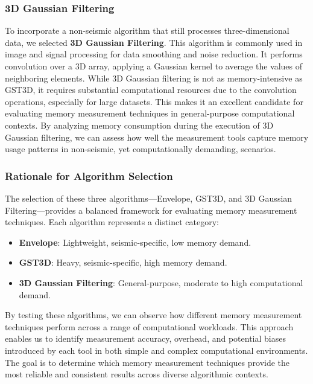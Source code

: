 
\subsubsection{3D Gaussian Filtering}

To incorporate a non-seismic algorithm that still processes three-dimensional data, we selected \textbf{3D Gaussian Filtering}.
This algorithm is commonly used in image and signal processing for data smoothing and noise reduction.
It performs convolution over a 3D array, applying a Gaussian kernel to average the values of neighboring elements.
While 3D Gaussian filtering is not as memory-intensive as \ac{GST3D}, it requires substantial computational resources due to the convolution operations, especially for large datasets.
This makes it an excellent candidate for evaluating memory measurement techniques in general-purpose computational contexts.
By analyzing memory consumption during the execution of 3D Gaussian filtering, we can assess how well the measurement tools capture memory usage patterns in non-seismic, yet computationally demanding, scenarios.


\subsubsection{Rationale for Algorithm Selection}

The selection of these three algorithms—Envelope, \ac{GST3D}, and 3D Gaussian Filtering—provides a balanced framework for evaluating memory measurement techniques.
Each algorithm represents a distinct category:

\begin{itemize}
    \item \textbf{Envelope}: Lightweight, seismic-specific, low memory demand.
    \item \textbf{\ac{GST3D}}: Heavy, seismic-specific, high memory demand.
    \item \textbf{3D Gaussian Filtering}: General-purpose, moderate to high computational demand.
\end{itemize}

By testing these algorithms, we can observe how different memory measurement techniques perform across a range of computational workloads.
This approach enables us to identify measurement accuracy, overhead, and potential biases introduced by each tool in both simple and complex computational environments.
The goal is to determine which memory measurement techniques provide the most reliable and consistent results across diverse algorithmic contexts.

